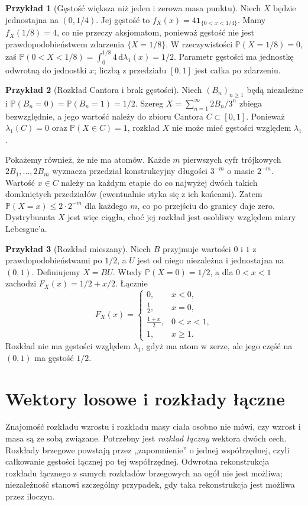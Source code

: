 \documentclass[11pt,a4paper,oneside]{report}
\numberwithin{equation}{chapter}
\theoremstyle{plain}
\theoremstyle{definition}
\newtheorem{przyklad}{Przykład}[chapter]
\theoremstyle{remark}
\newcommand{\Prob}{\mathbb{P}}
\newcommand{\ind}[1]{\mathbf{1}_{#1}}
\newcommand{\dd}{\mathrm{d}}
\begin{document}
\begin{przyklad}[Gęstość większa niż jeden i zerowa masa punktu]
Niech $X$ będzie jednostajna na $(0,1/4)$. Jej gęstość
to $f_X(x)=4\ind{\{0<x<1/4\}}$. Mamy $f_X(1/8)=4$,
co nie przeczy aksjomatom, ponieważ gęstość nie jest
prawdopodobieństwem zdarzenia $\{X=1/8\}$.
W rzeczywistości $\Prob(X=1/8)=0$, zaś
$\Prob(0<X<1/8)=\int_0^{1/8}4\,\dd\lambda_1(x)=1/2$.
Parametr gęstości ma jednostkę odwrotną do jednostki $x$;
liczbą z przedziału $[0,1]$ jest całka po zdarzeniu.
\end{przyklad}

\begin{przyklad}[Rozkład Cantora i brak gęstości]
Niech $(B_n)_{n\geq1}$ będą niezależne i
$\Prob(B_n=0)=\Prob(B_n=1)=1/2$. Szereg
$X=\sum_{n=1}^\infty 2B_n/3^n$ zbiega bezwzględnie,
a jego wartość należy do zbioru Cantora $C\subset[0,1]$.
Ponieważ $\lambda_1(C)=0$ oraz $\Prob(X\in C)=1$,
rozkład $X$ nie może mieć gęstości względem $\lambda_1$.

Pokażemy również, że nie ma atomów. Każde $m$ pierwszych
cyfr trójkowych $2B_1,\ldots,2B_m$ wyznacza przedział
konstrukcyjny długości $3^{-m}$ o masie $2^{-m}$.
Wartość $x\in C$ należy na każdym etapie do co najwyżej
dwóch takich domkniętych przedziałów (ewentualnie styka się
z ich końcami). Zatem $\Prob(X=x)\leq2\cdot2^{-m}$
dla każdego $m$, co po przejściu do granicy daje zero.
Dystrybuanta $X$ jest więc ciągła, choć jej rozkład
jest osobliwy względem miary Lebesgue'a.
\end{przyklad}

\begin{przyklad}[Rozkład mieszany]
Niech $B$ przyjmuje wartości $0$ i $1$ z prawdopodobieństwami po $1/2$,
a $U$ jest od niego niezależna i jednostajna na $(0,1)$.
Definiujemy $X=BU$. Wtedy $\Prob(X=0)=1/2$, a dla $0<x<1$
zachodzi $F_X(x)=1/2+x/2$. Łącznie
\[
F_X(x)=\begin{cases}
0,&x<0,\\
\frac12,&x=0,\\
\frac{1+x}{2},&0<x<1,\\
1,&x\geq1.
\end{cases}
\]
Rozkład nie ma gęstości względem $\lambda_1$, gdyż ma atom w zerze,
ale jego część na $(0,1)$ ma gęstość $1/2$.
\end{przyklad}

\section{Wektory losowe i rozkłady łączne}
Znajomość rozkładu wzrostu i rozkładu masy ciała osobno nie
mówi, czy wzrost i masa są ze sobą związane. Potrzebny jest
\emph{rozkład łączny} wektora dwóch cech. Rozkłady brzegowe
powstają przez „zapomnienie” o jednej współrzędnej, czyli
całkowanie gęstości łącznej po tej współrzędnej. Odwrotna
rekonstrukcja rozkładu łącznego z samych rozkładów brzegowych
na ogół nie jest możliwa; niezależność stanowi szczególny
przypadek, gdy taka rekonstrukcja jest możliwa przez iloczyn.
\end{document}
